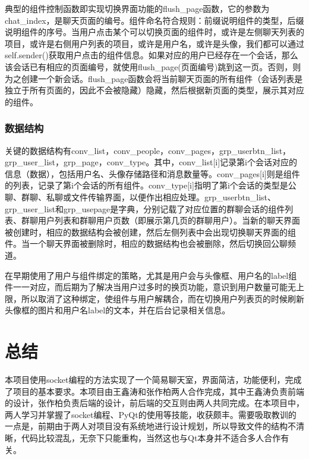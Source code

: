 \documentclass[12pt]{article} %
\begin{document}
\begin{sloppypar}
典型的组件控制函数即实现切换界面功能的flush\_page函数，它的参数为chat\_index，是聊天页面的编号。组件命名符合规则：前缀说明组件的类型，后缀说明组件的序号。当用户点击某个可以切换页面的组件时，或许是左侧聊天列表的项目，或许是右侧用户列表的项目，或许是用户名，或许是头像，我们都可以通过self.sender()获取用户点击的组件信息。如果对应的用户已经存在一个会话，那么该会话已有相应的页面编号，就使用flush\_page(页面编号)跳到这一页。否则，则为之创建一个新会话。flush\_page函数会将当前聊天页面的所有组件（会话列表是独立于所有页面的，因此不会被隐藏）隐藏，然后根据新页面的类型，展示其对应的组件。

\subsubsection{数据结构}

关键的数据结构有conv\_list，conv\_people，conv\_pages，grp\_userbtn\_list，grp\_user\_list，grp\_page，conv\_type。其中，conv\_list[i]记录第i个会话对应的信息（数据），包括用户名、头像存储路径和消息数量等。conv\_pages[i]则是组件的列表，记录了第i个会话的所有组件。conv\_type[i]指明了第i个会话的类型是公聊、群聊、私聊或文件传输界面，以便作出相应处理。grp\_userbtn\_list、grp\_user\_list和grp\_usepage是字典，分别记载了对应位置的群聊会话的组件列表、群聊用户列表和群聊用户页数（即展示第几页的群聊用户）。当新的聊天界面被创建时，相应的数据结构会被创建，然后左侧列表中会出现切换聊天界面的组件。当一个聊天界面被删除时，相应的数据结构也会被删除，然后切换回公聊频道。

在早期使用了用户与组件绑定的策略，尤其是用户会与头像框、用户名的label组件一一对应，而后期为了解决当用户过多时的换页功能，意识到用户数量可能无上限，所以取消了这种绑定，使组件与用户解耦合，而在切换用户列表页的时候刷新头像框的图片和用户名label的文本，并在后台记录相关信息。

\section{总结}

本项目使用socket编程的方法实现了一个简易聊天室，界面简洁，功能便利，完成了项目的基本要求。本项目由王鑫涛和张作柏两人合作完成，其中王鑫涛负责前端的设计，张作柏负责后端的设计，前后端的交互则由两人共同完成。在本项目中，两人学习并掌握了socket编程、PyQt的使用等技能，收获颇丰。需要吸取教训的一点是，前期由于两人对项目没有系统地进行设计规划，所以导致文件的结构不清晰，代码比较混乱，无奈下只能重构，当然这也与Qt本身并不适合多人合作有关。




\end{sloppypar}
\end{document}
